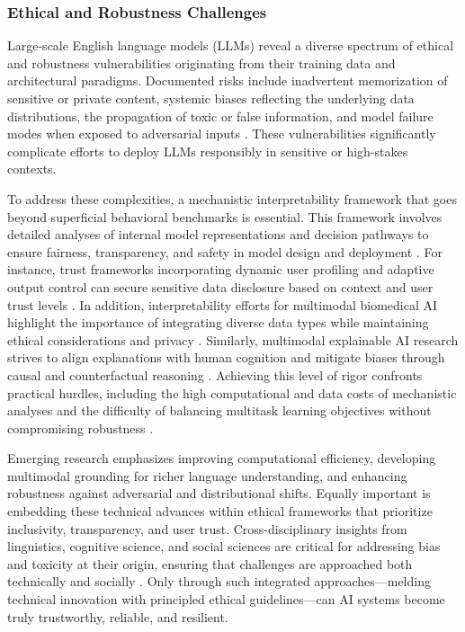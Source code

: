 \documentclass[sigconf]{acmart}
\begin{document}
\subsubsection{Ethical and Robustness Challenges}

Large-scale English language models (LLMs) reveal a diverse spectrum of ethical and robustness vulnerabilities originating from their training data and architectural paradigms. Documented risks include inadvertent memorization of sensitive or private content, systemic biases reflecting the underlying data distributions, the propagation of toxic or false information, and model failure modes when exposed to adversarial inputs \cite{ref34}. These vulnerabilities significantly complicate efforts to deploy LLMs responsibly in sensitive or high-stakes contexts.

To address these complexities, a mechanistic interpretability framework that goes beyond superficial behavioral benchmarks is essential. This framework involves detailed analyses of internal model representations and decision pathways to ensure fairness, transparency, and safety in model design and deployment \cite{ref11,ref12,ref13,ref34,ref35}. For instance, trust frameworks incorporating dynamic user profiling and adaptive output control can secure sensitive data disclosure based on context and user trust levels \cite{ref11}. In addition, interpretability efforts for multimodal biomedical AI highlight the importance of integrating diverse data types while maintaining ethical considerations and privacy \cite{ref12}. Similarly, multimodal explainable AI research strives to align explanations with human cognition and mitigate biases through causal and counterfactual reasoning \cite{ref13}. Achieving this level of rigor confronts practical hurdles, including the high computational and data costs of mechanistic analyses and the difficulty of balancing multitask learning objectives without compromising robustness \cite{ref16}.

Emerging research emphasizes improving computational efficiency, developing multimodal grounding for richer language understanding, and enhancing robustness against adversarial and distributional shifts. Equally important is embedding these technical advances within ethical frameworks that prioritize inclusivity, transparency, and user trust. Cross-disciplinary insights from linguistics, cognitive science, and social sciences are critical for addressing bias and toxicity at their origin, ensuring that challenges are approached both technically and socially \cite{ref34,ref35}. Only through such integrated approaches—melding technical innovation with principled ethical guidelines—can AI systems become truly trustworthy, reliable, and resilient.
\end{document}
